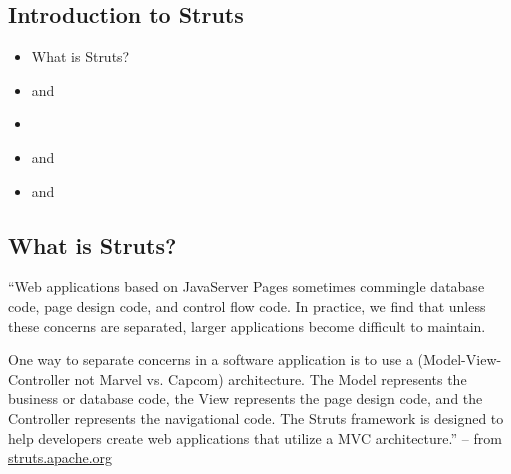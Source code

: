 \begin{ifhtml}
  \begin{s5slide}
    \section{Introduction to Struts}
    \begin{itemize}
      \item What is Struts?
      \item {} and 
      \item {}
      \item {} and 
      \item {} and 
    \end{itemize}
  \end{s5slide}

  \begin{s5slide}
    \section{What is Struts?}
     ``Web applications based on JavaServer Pages sometimes commingle database code, page design code, and control flow code. In practice, we find that unless these concerns are separated, larger applications become difficult to maintain.

One way to separate concerns in a software application is to use a \MVC (Model-View-Controller not Marvel vs. Capcom) 
architecture. The Model represents the business or database code, the View represents the page design code, and the Controller represents the navigational code. The Struts framework is designed to help developers create web applications that utilize a MVC architecture.'' -- from 
\href{http://struts.apache.org}{struts.apache.org}

  \end{s5slide}

\end{ifhtml}